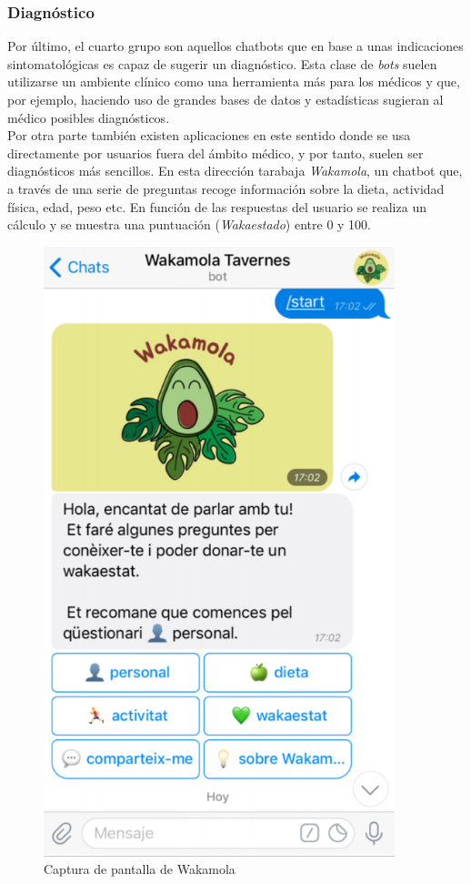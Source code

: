 \subsubsection{Diagnóstico}
Por último, el cuarto grupo son aquellos chatbots que en base a unas indicaciones sintomatológicas es capaz de sugerir un diagnóstico. Esta clase de \textit{bots} suelen utilizarse un ambiente clínico como una herramienta más para los médicos y que, por ejemplo, haciendo uso de grandes bases de datos y estadísticas sugieran al médico posibles diagnósticos.\\

Por otra parte también existen aplicaciones en este sentido donde se usa directamente por usuarios fuera del ámbito médico, y por tanto, suelen ser diagnósticos más sencillos. En esta dirección tarabaja \textit{Wakamola}, un chatbot que, a través de una serie de preguntas recoge información sobre la dieta, actividad física, edad, peso etc. En función de las respuestas del usuario se realiza un cálculo y se muestra una puntuación (\textit{Wakaestado}) entre 0 y 100.

\begin{figure}[htbp]
\centering
\includegraphics[scale=0.5]{../images/wakamola.png} 
\caption{Captura de pantalla de Wakamola}
\label{fig:x captura wakamola}
\end{figure}


